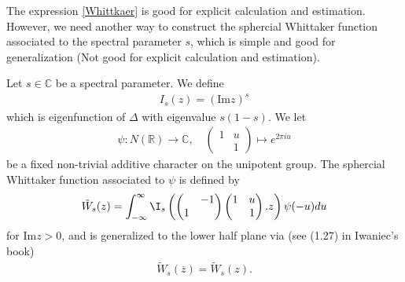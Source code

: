 \documentclass[11pt,reqno]{amsart}
\newcommand{\bea}{\begin{eqnarray}}
\newcommand{\eea}{\end{eqnarray}}
\newcommand{\bna}{\begin{eqnarray*}}
\newcommand{\ena}{\end{eqnarray*}}
\newcommand{\bma}{\begin{pmatrix}}
\newcommand{\ema}{\end{pmatrix}}
\def\im{{\mathrm{Im}}}
\def\C{\mathbb{C}}
\def\R{\mathbb{R}}
\theoremstyle{definition}
\begin{document}
The expression \eqref{Whittkaer} is good for explicit calculation and estimation.
However, we need another way to construct the sphercial Whittaker function
associated to the spectral parameter $s$, which is simple and good for generalization
(Not good for explicit calculation and estimation).


Let $s\in \C$ be a spectral parameter.  We define
\bna
I_s(z)=(\im z)^s
\ena
which is eigenfunction of $\Delta$ with eigenvalue $s(1-s)$.
We let
\bna
\psi:N(\R)\rightarrow\C,\quad \bma 1&u\\&1\ema\mapsto e^{2\pi i u}
\ena
be a fixed non-trivial additive character on the unipotent group.
The sphercial Whittaker function associated to $\psi$ is defined by
\bea
\tilde W_s(z)
=\int_{-\infty}^\infty \I_s\left(\bma&-1\\1\ema\bma 1&u\\&1\ema.z\right)\psi(-u)du
\label{spherical-Whittaker}
\eea
for $\im z>0$, and is generalized to the lower half plane via (see (1.27) in Iwaniec's book)
\bna
\tilde W_s(\overline z)=\tilde W_s(z).
\ena
\end{document}
